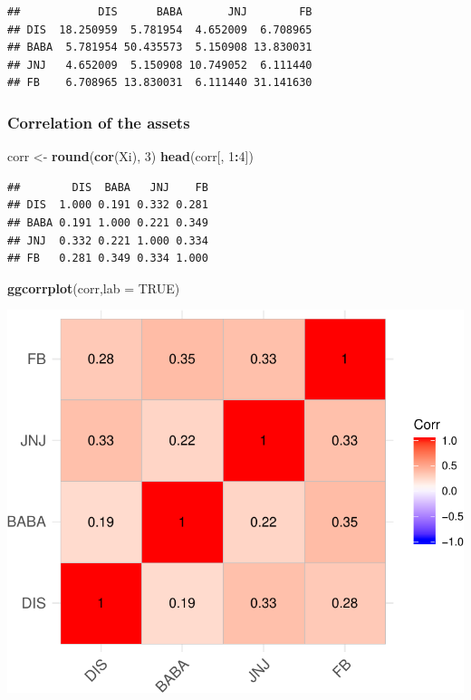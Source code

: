 \documentclass[]{article}
\newenvironment{Shaded}{\begin{snugshade}}{\end{snugshade}}
\newcommand{\KeywordTok}[1]{\textcolor[rgb]{0.13,0.29,0.53}{\textbf{#1}}}
\newcommand{\DataTypeTok}[1]{\textcolor[rgb]{0.13,0.29,0.53}{#1}}
\newcommand{\DecValTok}[1]{\textcolor[rgb]{0.00,0.00,0.81}{#1}}
\newcommand{\StringTok}[1]{\textcolor[rgb]{0.31,0.60,0.02}{#1}}
\newcommand{\OtherTok}[1]{\textcolor[rgb]{0.56,0.35,0.01}{#1}}
\newcommand{\OperatorTok}[1]{\textcolor[rgb]{0.81,0.36,0.00}{\textbf{#1}}}
\newcommand{\NormalTok}[1]{#1}
\begin{document}
\begin{verbatim}
##            DIS      BABA       JNJ        FB
## DIS  18.250959  5.781954  4.652009  6.708965
## BABA  5.781954 50.435573  5.150908 13.830031
## JNJ   4.652009  5.150908 10.749052  6.111440
## FB    6.708965 13.830031  6.111440 31.141630
\end{verbatim}

\subsubsection{Correlation of the
assets}\label{correlation-of-the-assets}

\begin{Shaded}
\begin{Highlighting}[]
\NormalTok{corr <-}\StringTok{ }\KeywordTok{round}\NormalTok{(}\KeywordTok{cor}\NormalTok{(Xi), }\DecValTok{3}\NormalTok{)}
\KeywordTok{head}\NormalTok{(corr[, }\DecValTok{1}\OperatorTok{:}\DecValTok{4}\NormalTok{])}
\end{Highlighting}
\end{Shaded}

\begin{verbatim}
##        DIS  BABA   JNJ    FB
## DIS  1.000 0.191 0.332 0.281
## BABA 0.191 1.000 0.221 0.349
## JNJ  0.332 0.221 1.000 0.334
## FB   0.281 0.349 0.334 1.000
\end{verbatim}

\begin{Shaded}
\begin{Highlighting}[]
\KeywordTok{ggcorrplot}\NormalTok{(corr,}\DataTypeTok{lab =} \OtherTok{TRUE}\NormalTok{)}
\end{Highlighting}
\end{Shaded}

\includegraphics{Markowitz_Research_Me_files/figure-latex/unnamed-chunk-13-1.pdf}
\end{document}
